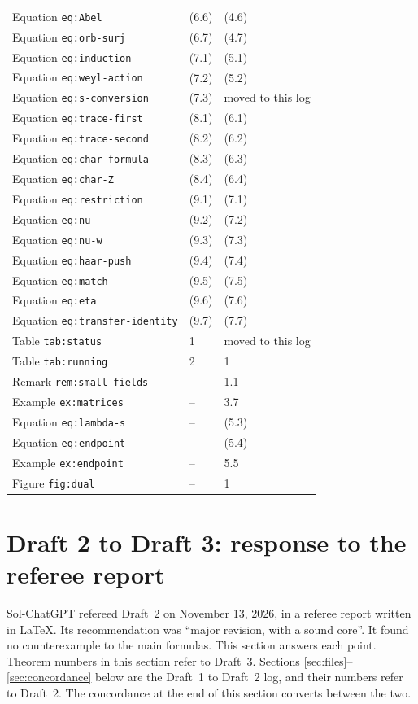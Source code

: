 \documentclass[12pt,letterpaper]{article}
\begin{document}
{\begin{longtable}{@{}lll@{}}
Equation \texttt{eq:Abel} & (6.6) & (4.6)\\
Equation \texttt{eq:orb-surj} & (6.7) & (4.7)\\
Equation \texttt{eq:induction} & (7.1) & (5.1)\\
Equation \texttt{eq:weyl-action} & (7.2) & (5.2)\\
Equation \texttt{eq:s-conversion} & (7.3) & moved to this log\\
Equation \texttt{eq:trace-first} & (8.1) & (6.1)\\
Equation \texttt{eq:trace-second} & (8.2) & (6.2)\\
Equation \texttt{eq:char-formula} & (8.3) & (6.3)\\
Equation \texttt{eq:char-Z} & (8.4) & (6.4)\\
Equation \texttt{eq:restriction} & (9.1) & (7.1)\\
Equation \texttt{eq:nu} & (9.2) & (7.2)\\
Equation \texttt{eq:nu-w} & (9.3) & (7.3)\\
Equation \texttt{eq:haar-push} & (9.4) & (7.4)\\
Equation \texttt{eq:match} & (9.5) & (7.5)\\
Equation \texttt{eq:eta} & (9.6) & (7.6)\\
Equation \texttt{eq:transfer-identity} & (9.7) & (7.7)\\
Table \texttt{tab:status} & 1 & moved to this log\\
Table \texttt{tab:running} & 2 & 1\\
Remark \texttt{rem:small-fields} & -- & 1.1\\
Example \texttt{ex:matrices} & -- & 3.7\\
Equation \texttt{eq:lambda-s} & -- & (5.3)\\
Equation \texttt{eq:endpoint} & -- & (5.4)\\
Example \texttt{ex:endpoint} & -- & 5.5\\
Figure \texttt{fig:dual} & -- & 1\\
\bottomrule
\end{longtable}}

\section{Draft 2 to Draft 3: response to the referee report}
\label{sec:draft3}

Sol-ChatGPT refereed Draft~2 on November 13, 2026, in a referee
report written in \LaTeX. Its
recommendation was ``major revision, with a sound core''. It found no
counterexample to the main formulas. This section answers each point.
Theorem numbers in this section refer to Draft~3. Sections
\ref{sec:files}--\ref{sec:concordance} below are the Draft~1 to Draft~2
log, and their numbers refer to Draft~2. The concordance at the end of
this section converts between the two.
\end{document}
